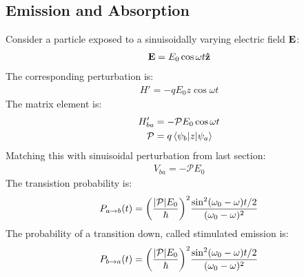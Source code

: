 \subsection{Emission and Absorption}
Consider a particle exposed to a sinuisoidally varying electric field $\vb{E}$:
\begin{align*}
  \vb{E}=E_0\cos\omega t\vu{z}
\end{align*}
The corresponding perturbation is:
\begin{align*}
  H'=-qE_0z\cos\omega t
\end{align*}
The matrix element is:
\begin{align*}
  H'_{ba}&=-\mathcal{P}E_0\cos\omega t\\
  \mathcal{P}&=q\mel{\psi_b}{z}{\psi_a}
\end{align*}
Matching this with sinuisoidal perturbation from last section:
\begin{align*}
  V_{ba}=-\mathcal{P}E_0
\end{align*}
The transistion probability is:
\begin{align*}
  P_{a\to b}(t)=\qty(\frac{\abs{\mathcal{P}}E_0}{\hbar})^2
  \frac{\sin^2(\omega_0-\omega)t/2}{(\omega_0-\omega)^2}
\end{align*}
The probability of a transition down, called stimulated emission is:
\begin{align*}
  P_{b\to a}(t)=\qty(\frac{\abs{\mathcal{P}}E_0}{\hbar})^2
  \frac{\sin^2(\omega_0-\omega)t/2}{(\omega_0-\omega)^2}
\end{align*}

